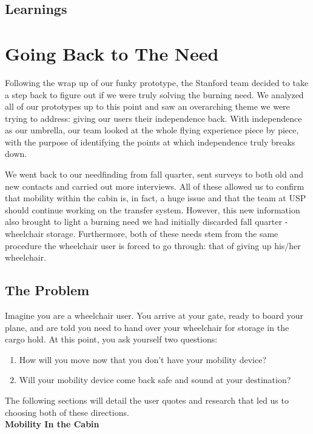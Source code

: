 \subsection{Learnings}
\section{Going Back to The Need}
Following the wrap up of our funky prototype, the Stanford team decided to take a step back to figure out if we were truly solving the burning need. We analyzed all of our prototypes up to this point and saw an overarching theme we were trying to address: giving our users their independence back. With independence as our umbrella, our team looked at the whole flying experience piece by piece, with the purpose of identifying the points at which independence truly breaks down. 

We went back to our needfinding from fall quarter, sent surveys to both old and new contacts and carried out more interviews. All of these allowed us to confirm that mobility within the cabin is, in fact, a huge issue and that the team at USP should continue working on the transfer system. However, this new information also brought to light a burning need we had initially discarded fall quarter - wheelchair storage. Furthermore, both of these needs stem from the same procedure the wheelchair user is forced to go through: that of giving up his/her wheelchair. 

\subsection{The Problem}

Imagine you are a wheelchair user. You arrive at your gate, ready to board your plane, and are told you need to hand over your wheelchair for storage in the cargo hold. At this point, you ask yourself two questions: 
\begin{enumerate}
	\item How will you move now that you don't have your mobility device? 
	\item Will your mobility device come back safe and sound at your destination?
\end{enumerate}
The following sections will detail the user quotes and research that led us to choosing both of these directions.  
\\

\textbf{Mobility In the Cabin}

